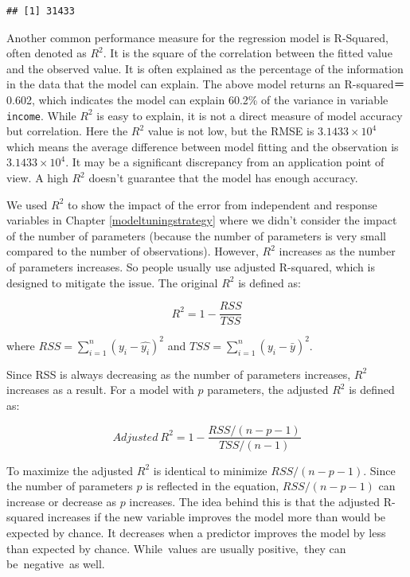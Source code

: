 \documentclass[
  12pt,
]{krantz}
\begin{document}
\begin{verbatim}
## [1] 31433
\end{verbatim}

Another common performance measure for the regression model is R-Squared, often denoted as \(R^2\). It is the square of the correlation between the fitted value and the observed value. It is often explained as the percentage of the information in the data that the model can explain. The above model returns an R-squared＝ 0.602, which indicates the model can explain 60.2\% of the variance in variable \texttt{income}. While \(R^2\) is easy to explain, it is not a direct measure of model accuracy but correlation. Here the \(R^2\) value is not low, but the RMSE is \ensuremath{3.1433\times 10^{4}} which means the average difference between model fitting and the observation is \ensuremath{3.1433\times 10^{4}}. It may be a significant discrepancy from an application point of view. A high \(R^2\) doesn't guarantee that the model has enough accuracy.

We used \(R^2\) to show the impact of the error from independent and response variables in Chapter \ref{modeltuningstrategy} where we didn't consider the impact of the number of parameters (because the number of parameters is very small compared to the number of observations). However, \(R^2\) increases as the number of parameters increases. So people usually use adjusted R-squared, which is designed to mitigate the issue. The original \(R^2\) is defined as:

\[R^{2}=1-\frac{RSS}{TSS}\]

where \(RSS=\sum_{i=1}^{n}(y_{i}-\hat{y_{i}})^{2}\) and \(TSS=\sum_{i=1}^{n}(y_{i}-\bar{y})^{2}\).

Since RSS is always decreasing as the number of parameters increases, \(R^2\) increases as a result. For a model with \(p\) parameters, the adjusted \(R^2\) is defined as:

\[Adjusted\ R^{2}=1-\frac{RSS/(n-p-1)}{TSS/(n-1)}\]

To maximize the adjusted \(R^{2}\) is identical to minimize \(RSS/(n-p-1)\). Since the number of parameters \(p\) is reflected in the equation, \(RSS/(n-p-1)\) can increase or decrease as \(p\) increases. The idea behind this is that the adjusted R-squared increases if the new variable improves the model more than would be expected by chance. It decreases when a predictor improves the model by less than expected by chance. While~values are usually positive,~they can be~negative~as well.
\end{document}

